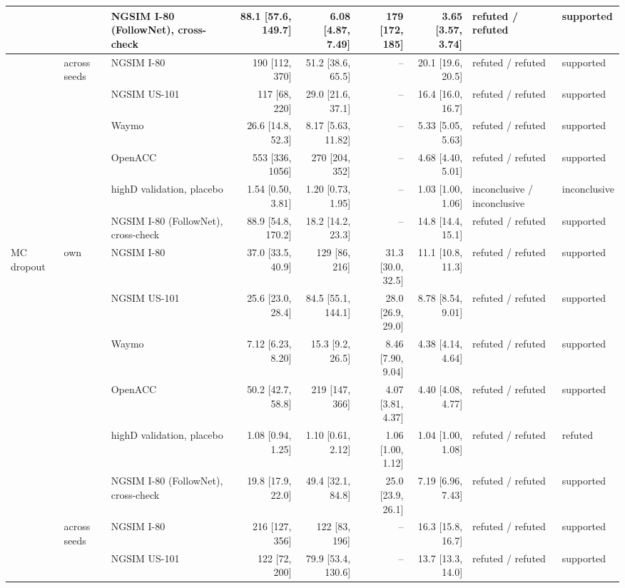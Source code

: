 \begin{longtable}{lllrrrrll}
 &  & NGSIM I-80 (FollowNet), cross-check & 88.1 [57.6, 149.7] & 6.08 [4.87, 7.49] & 179 [172, 185] & 3.65 [3.57, 3.74] & refuted / refuted & supported \\
\midrule
 & across seeds & NGSIM I-80 & 190 [112, 370] & 51.2 [38.6, 65.5] & -- & 20.1 [19.6, 20.5] & refuted / refuted & supported \\
 &  & NGSIM US-101 & 117 [68, 220] & 29.0 [21.6, 37.1] & -- & 16.4 [16.0, 16.7] & refuted / refuted & supported \\
 &  & Waymo & 26.6 [14.8, 52.3] & 8.17 [5.63, 11.82] & -- & 5.33 [5.05, 5.63] & refuted / refuted & supported \\
 &  & OpenACC & 553 [336, 1056] & 270 [204, 352] & -- & 4.68 [4.40, 5.01] & refuted / refuted & supported \\
 &  & highD validation, placebo & 1.54 [0.50, 3.81] & 1.20 [0.73, 1.95] & -- & 1.03 [1.00, 1.06] & inconclusive / inconclusive & inconclusive \\
 &  & NGSIM I-80 (FollowNet), cross-check & 88.9 [54.8, 170.2] & 18.2 [14.2, 23.3] & -- & 14.8 [14.4, 15.1] & refuted / refuted & supported \\
\midrule
MC dropout & own & NGSIM I-80 & 37.0 [33.5, 40.9] & 129 [86, 216] & 31.3 [30.0, 32.5] & 11.1 [10.8, 11.3] & refuted / refuted & supported \\
 &  & NGSIM US-101 & 25.6 [23.0, 28.4] & 84.5 [55.1, 144.1] & 28.0 [26.9, 29.0] & 8.78 [8.54, 9.01] & refuted / refuted & supported \\
 &  & Waymo & 7.12 [6.23, 8.20] & 15.3 [9.2, 26.5] & 8.46 [7.90, 9.04] & 4.38 [4.14, 4.64] & refuted / refuted & supported \\
 &  & OpenACC & 50.2 [42.7, 58.8] & 219 [147, 366] & 4.07 [3.81, 4.37] & 4.40 [4.08, 4.77] & refuted / refuted & supported \\
 &  & highD validation, placebo & 1.08 [0.94, 1.25] & 1.10 [0.61, 2.12] & 1.06 [1.00, 1.12] & 1.04 [1.00, 1.08] & refuted / refuted & refuted \\
 &  & NGSIM I-80 (FollowNet), cross-check & 19.8 [17.9, 22.0] & 49.4 [32.1, 84.8] & 25.0 [23.9, 26.1] & 7.19 [6.96, 7.43] & refuted / refuted & supported \\
\midrule
 & across seeds & NGSIM I-80 & 216 [127, 356] & 122 [83, 196] & -- & 16.3 [15.8, 16.7] & refuted / refuted & supported \\
 &  & NGSIM US-101 & 122 [72, 200] & 79.9 [53.4, 130.6] & -- & 13.7 [13.3, 14.0] & refuted / refuted & supported \\

\end{longtable}
